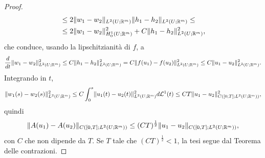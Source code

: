 \begin{proof}
\begin{align*}
&\le 2 \lVert w_1-w_2\rVert_{L^2(U;\mathbb{R}^m)}\lVert h_1-h_2\rVert_{L^2(U;\mathbb{R}^m)}\le \\
&\le 2\lVert w_1 - w_2\rVert_{H^1_0(U;\mathbb{R}^m)}^2 + C\lVert h_1-h_2\rVert_{L^2(U;\mathbb{R}^m)}^2,
\end{align*}
che conduce, usando la lipschitzianità di $f$, a
\[ \frac{d}{dt}\lVert w_1-w_2\rVert_{L^2(U;\mathbb{R}^m)}^2 \le C\lVert h_1-h_2\rVert_{L^2(U;\mathbb{R}^m)}^2 = C \lVert f(u_1)-f(u_2)\rVert_{L^2(U;\mathbb{R}^m)}^2 \le C \lVert u_1 - u_2\rVert_{L^2(U;\mathbb{R}^m)}^2. \]
Integrando in $t$,
\[ \lVert w_1(s)-w_2(s)\rVert_{L^2(U;\mathbb{R}^m)}^2 \le C \int_0^s \lVert u_1(t) - u_2(t)\rVert_{L^2(U;\mathbb{R}^m)}^2d\mathcal{L}^1(t) \le CT \lVert u_1-u_2\rVert_{C([0,T];L^2(U;\mathbb{R}^m))}^2, \]
quindi 
\[ \lVert A(u_1)-A(u_2)\rVert_{C([0,T];L^2(U;\mathbb{R}^m))} \le(CT)^{\frac{1}{2}} \lVert u_1-u_2\rVert_{C([0,T];L^2(U;\mathbb{R}^m))}, \]
con $C$ che non dipende da $T$. Se $T$ tale che $(CT)^{\frac{1}{2}} <1$, la tesi segue dal Teorema delle contrazioni.
\end{proof}

